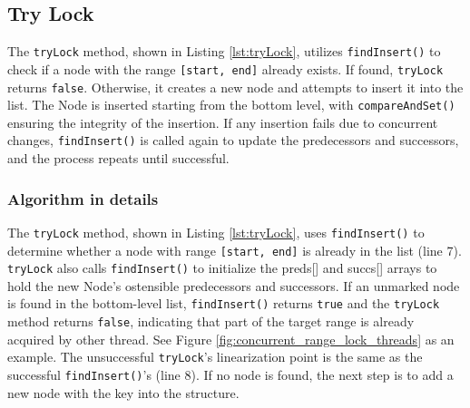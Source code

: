 \subsection{Try Lock}\label{subsec:tryLock}

The \texttt{tryLock} method, shown in Listing \ref{lst:tryLock}, utilizes \texttt{findInsert()} to check if a node with the range \texttt{[start, end]} already exists. If found, \texttt{tryLock} returns \texttt{false}. 
Otherwise, it creates a new node and attempts to insert it into the list. 
The Node is inserted starting from the bottom level, with \texttt{compareAndSet()} ensuring the integrity of the insertion. 
If any insertion fails due to concurrent changes, \texttt{findInsert()} is called again to update the predecessors and successors, and the process repeats until successful.

\vspace{15pt}
\begin{figure}[h]
    \centering
    
\end{figure}

\subsubsection*{Algorithm in details}
The \texttt{tryLock} method, shown in Listing \ref{lst:tryLock}, uses \texttt{findInsert()} to determine whether a node with range \texttt{[start, end]} is already in the list (line 7). 
\texttt{tryLock} also calls \texttt{findInsert()} to initialize the preds[] and succs[] arrays to hold the new Node's ostensible predecessors and successors.
If an unmarked node is found in the bottom-level list, \texttt{findInsert()} returns \texttt{true} and the \texttt{tryLock} method returns \texttt{false}, indicating that part of the target range is already acquired by other thread.
See Figure \ref{fig:concurrent_range_lock_threads} as an example.
The unsuccessful \texttt{tryLock}'s linearization point is the same as the successful \texttt{findInsert()}'s (line 8). 
If no node is found, the next step is to add a new node with the key into the structure.

